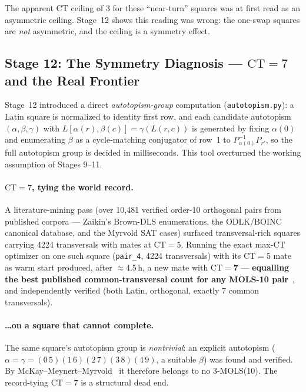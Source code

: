 \documentclass[11pt,a4paper]{article}
\theoremstyle{remark}
\newcommand{\CT}{\mathrm{CT}}
\begin{document}
The apparent $\CT$ ceiling of 3 for these ``near-turn'' squares was at
first read as an asymmetric ceiling. Stage~12 shows this reading was
wrong: the one-swap squares are \emph{not} asymmetric, and the ceiling is
a symmetry effect.

\subsection{Stage 12: The Symmetry Diagnosis --- $\CT=7$ and the Real Frontier}
\label{sec:stage12}

Stage~12 introduced a direct \emph{autotopism-group} computation
(\texttt{autotopism.py}): a Latin square is normalized to identity first
row, and each candidate autotopism $(\alpha,\beta,\gamma)$ with
$L[\alpha(r),\beta(c)] = \gamma(L(r,c))$ is generated by fixing $\alpha(0)$
and enumerating $\beta$ as a cycle-matching conjugator of row~1 to
$P_{\alpha(0)}^{-1}P_{r'}$, so the full autotopism group is decided in
milliseconds. This tool overturned the working assumption of Stages 9--11.

\paragraph{$\CT = 7$, tying the world record.} A literature-mining pass
(over 10{,}481 verified order-10 orthogonal pairs from published corpora
--- Zaikin's Brown-DLS enumerations, the ODLK/BOINC canonical database, and
the Myrvold SAT cases) surfaced transversal-rich squares carrying 4224
transversals with mates at $\CT = 5$. Running the exact max-$\CT$ optimizer
on one such square (\texttt{pair\_4}, 4224 transversals) with its $\CT=5$
mate as warm start produced, after $\approx$4.5\,h, a new mate with
$\CT = \mathbf{7}$ --- \textbf{equalling the best published common-transversal
count for any MOLS-10 pair}~\cite{bright2022}, and independently verified
(both Latin, orthogonal, exactly 7 common transversals).

\paragraph{\ldots on a square that cannot complete.} The same square's
autotopism group is \emph{nontrivial}: an explicit autotopism
($\alpha=\gamma=(0\,5)(1\,6)(2\,7)(3\,8)(4\,9)$, a suitable $\beta$) was
found and verified. By McKay--Meynert--Myrvold~\cite{mmm2007} it therefore
belongs to no 3-MOLS(10). The record-tying $\CT=7$ is a structural
dead end.
\end{document}
